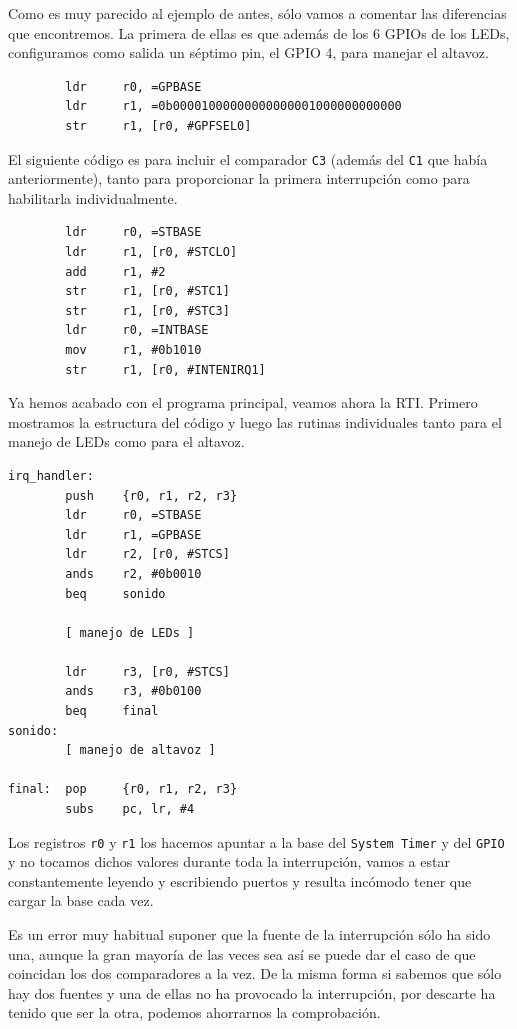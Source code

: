 Como es muy parecido al ejemplo de antes, sólo vamos a comentar las diferencias que encontremos.
La primera de ellas es que además de los 6 GPIOs de los LEDs, configuramos como salida un séptimo
pin, el GPIO 4, para manejar el altavoz.

\begin{lstlisting}
        ldr     r0, =GPBASE
        ldr     r1, =0b00001000000000000001000000000000
        str     r1, [r0, #GPFSEL0]
\end{lstlisting}

El siguiente código es para incluir el comparador {\tt C3} (además del {\tt C1} que había
anteriormente), tanto para proporcionar la primera
interrupción como para habilitarla individualmente.

\begin{lstlisting}
        ldr     r0, =STBASE
        ldr     r1, [r0, #STCLO]
        add     r1, #2
        str     r1, [r0, #STC1]
        str     r1, [r0, #STC3]
        ldr     r0, =INTBASE
        mov     r1, #0b1010
        str     r1, [r0, #INTENIRQ1]
\end{lstlisting}

Ya hemos acabado con el programa principal, veamos ahora la RTI. Primero mostramos la estructura
del código y luego las rutinas individuales tanto para el manejo de LEDs como para el
altavoz.

\begin{lstlisting}
irq_handler:
        push    {r0, r1, r2, r3}
        ldr     r0, =STBASE
        ldr     r1, =GPBASE
        ldr     r2, [r0, #STCS]
        ands    r2, #0b0010
        beq     sonido

        [ manejo de LEDs ]

        ldr     r3, [r0, #STCS]
        ands    r3, #0b0100
        beq     final
sonido:
        [ manejo de altavoz ]

final:  pop     {r0, r1, r2, r3}
        subs    pc, lr, #4
\end{lstlisting}

Los registros {\tt r0} y {\tt r1} los hacemos apuntar a la base del {\tt System Timer} y del
{\tt GPIO} y no tocamos dichos valores durante toda la interrupción, vamos a estar
constantemente leyendo y escribiendo puertos y resulta incómodo tener que cargar la
base cada vez.

Es un error muy habitual suponer que la fuente de la interrupción sólo ha sido una, aunque
la gran mayoría de las veces sea así se puede dar el caso de que coincidan los dos comparadores
a la vez. De la misma forma si sabemos que sólo hay dos fuentes y una de ellas no ha
provocado la interrupción, por descarte ha tenido que ser la otra, podemos ahorrarnos la
comprobación.

